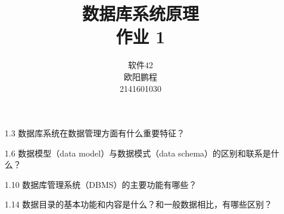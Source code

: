 \documentclass[UTF8]{ctexart}
\title{数据库系统原理 \\ 作业 1}
\author{软件42 \\ 欧阳鹏程 \\ 2141601030}
\begin{document}
\maketitle

\begin{itemize}
	\item[1.3] 数据库系统在数据管理方面有什么重要特征？
	\item[1.6] 数据模型（data model）与数据模式（data schema）的区别和联系是什么？
	\item[1.10] 数据库管理系统（DBMS）的主要功能有哪些？
	\item[1.14] 数据目录的基本功能和内容是什么？和一般数据相比，有哪些区别？
\end{itemize}
\end{document}
